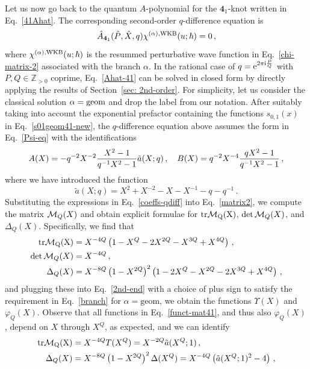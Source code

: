\documentclass[a4paper,11pt]{article}
\theoremstyle{definition}
\newcommand{\CM}{{\cal M}}
\def\IZ{{\mathbb Z}}
\def\FE{\bm{4}_1}
\newcommand{\re}{{\rm e}}
\newcommand{\ri}{{\rm i}}
\newcommand{\be}{\begin{equation}}
\newcommand{\ee}{\end{equation}}
\newcommand{\ba}{\begin{aligned}}
\newcommand{\ea}{\end{aligned}}
\begin{document}
Let us now go back to the quantum $A$-polynomial for the $\FE$-knot written in Eq.~\eqref{41Ahat}. The corresponding second-order $q$-difference equation is
\be \label{Ahat-41}
\hat{A}_{\FE}(\hat{P}, \hat{X}, q) \chi^{(\alpha), \rm{WKB}}(u; \hbar) = 0 \, ,
\ee
where $\chi^{(\alpha), \rm{WKB}}(u; \hbar)$ is the resummed perturbative wave function in Eq.~\eqref{chi-matrix-2} associated with the branch $\alpha$.
In the rational case of $q= \re^{2 \pi \ri {P \over Q}}$ with $P, Q \in \IZ_{>0}$ coprime, Eq.~\eqref{Ahat-41} can be solved in closed form by directly applying the results of Section~\ref{sec: 2nd-order}. 
For simplicity, let us consider the classical solution $\alpha = \rm{geom}$ and drop the label from our notation.
After suitably taking into account the exponential prefactor containing the functions $s_{0,1}(x)$ in Eq.~\eqref{s01geom41-new}, the $q$-difference equation above assumes the form in Eq.~\eqref{Psi-eq} with the identifications
 \be \label{coeffs-qdiff}
 \ba
 A(X)= -q^{-2} X^{-2} {X^2-1 \over q^{-1}X^2-1} \tilde{a}(X;q) \, , \quad B(X)= q^{-2}  X^{-4} {qX^2-1 \over q^{-1}X^2-1} \, ,
  \ea
 \ee
 where we have introduced the function
 \be \label{atilde}
 \tilde{a}(X;q) = X^2+ X^{-2} -X-X^{-1}-q-q^{-1} \, .
 \ee
Substituting the expressions in Eq.~\eqref{coeffs-qdiff} into Eq.~\eqref{matrix2}, we compute the matrix $\CM_Q(X)$ and obtain explicit formulae for $\rm{tr} \CM_Q(X)$, $\det \CM_Q(X)$, and $\Delta_Q(X)$. Specifically, we find that
\begin{subequations} \label{funct-mat41}
\begin{align}
\rm{tr} \CM_Q(X) &= X^{-4 Q} \left(1- X^Q - 2 X^{2 Q} - X^{3 Q} + X^{4 Q} \right) \, , \\
\det \CM_Q(X) &=X^{-4 Q} \, , \\
\Delta_Q(X) &= X^{-8 Q}\left(1-X^{2 Q}\right)^2 \left(1-2 X^{Q} -X^{2 Q}-2 X^{3 Q}+X^{4 Q}\right) \, ,
\end{align}
\end{subequations}
and plugging these into Eq.~\eqref{2nd-end} with a choice of plus sign to satisfy the requirement in Eq.~\eqref{branch} for $\alpha=\text{geom}$, we obtain the functions $\Upsilon (X)$ and $\varphi_Q(X)$. Observe that all functions in Eq.~\eqref{funct-mat41}, and thus also $\varphi_Q(X)$, depend on $X$ through $X^Q$, as expected, and we can identify
\begin{subequations} 
\begin{align}
\rm{tr} \CM_Q(X) &= X^{-4 Q} T(X^Q) = X^{-2 Q} \tilde{a}(X^Q; 1) \, , \\
\Delta_Q(X) &= X^{-8 Q}\left(1-X^{2 Q}\right)^2 \Delta(X^Q) = X^{-4 Q} \left(\tilde{a}(X^Q; 1)^2 - 4 \right) \, ,
\end{align}
\end{subequations}
\end{document}
